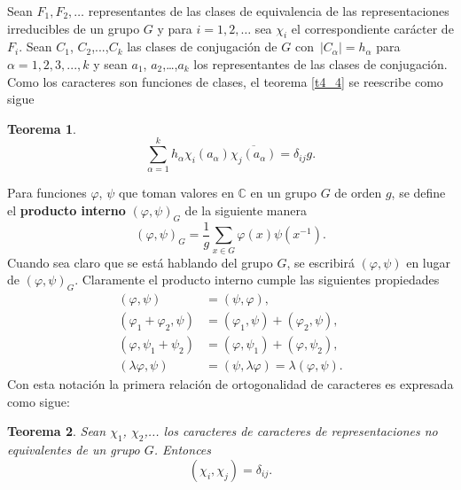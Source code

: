 \documentclass[12pt]{book}
\newtheorem{theorem}{Teorema}[section]
\theoremstyle{definition}
\newcounter{in}
\begin{document}
Sean $F_{1}, F_{2}, \ldots$ representantes de las clases de
equivalencia de las representaciones irreducibles de un grupo $G$ y
para $i=1,2, \ldots$ sea $\chi_{i}$ el correspondiente carácter
de $F_{i}$.  Sean $C_{1}$, $C_{2}$,...,$C_{k}$ las
clases de conjugación de $G$ con~$|C_{\alpha}|=h_{\alpha}$
para $\alpha=1, 2, 3,...,k$ y sean $a_{1}$, $a_{2}$,\ldots,$a_{k}$ los
representantes de las clases de conjugación. Como los caracteres son
funciones de clases, el teorema \ref{t4_4} se reescribe como sigue
\begin{theorem}
  \label{t4_4p}
  \begin{equation}
    \label{eq:32}
    \sum_{\alpha=1}^{k} h_{\alpha} \chi_{i}(a_{\alpha}) \overline{\chi_{j}(a_{\alpha})} = \delta_{ij}g.
  \end{equation}
\end{theorem}
Para funciones $\varphi$, $\psi$ que toman valores en $\mathbb{C}$ en
un grupo $G$ de orden $g$, se define el \textbf{producto interno}
$(\varphi,\psi)_{G}$ de la siguiente manera
\begin{equation*}
(\varphi,\psi)_{G} = \frac{1}{g} \sum_{x \in G} \varphi(x) \psi(x^{-1}).
\end{equation*}
Cuando sea claro que se está hablando del grupo $G$, se escribirá
$(\varphi,\psi)$ en lugar de $(\varphi,\psi)_{G}$. Claramente el
producto interno cumple las siguientes propiedades
\begin{equation}
  \label{eq:33}
    \begin{aligned}
    (\varphi,\psi) &= (\psi,\varphi), \\
    (\varphi_{1}+\varphi_{2},\psi) &= (\varphi_{1},\psi)+(\varphi_{2},\psi), \\
    (\varphi,\psi_{1}+\psi_{2}) &= (\varphi,\psi_{1})+(\varphi,\psi_{2}), \\
    (\lambda \varphi,\psi) &= (\psi,\lambda \varphi)=\lambda (\varphi,\psi).
  \end{aligned}
\end{equation}
Con esta notación la primera relación de ortogonalidad de caracteres
es expresada como sigue:

\begin{theorem}
  \label{t4_4pp}
  Sean $\chi_{1}$, $\chi_{2}$,... los caracteres de caracteres de
  representaciones no equivalentes de un grupo $G$. Entonces
  \begin{equation*}
    (\chi_{i},\chi_{j})=\delta_{ij}.
  \end{equation*} 
\end{theorem}
\end{document}
